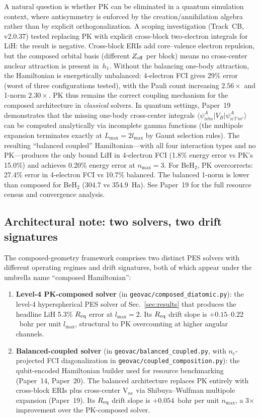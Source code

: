 \documentclass[aps,pra,twocolumn,superscriptaddress,longbibliography,floatfix]{revtex4-2}
\begin{document}
A natural question is whether PK can be eliminated in a quantum
simulation context, where antisymmetry is enforced by the
creation/annihilation algebra rather than by explicit orthogonalization.
A scoping investigation (Track~CB, v2.0.37) tested replacing PK with
explicit cross-block two-electron integrals for LiH:
the result is negative.  Cross-block ERIs add core--valence electron
repulsion, but the composed orbital basis (different $Z_{\rm eff}$ per
block) means no cross-center nuclear attraction is present in~$h_1$.
Without the balancing one-body attraction, the Hamiltonian is
energetically unbalanced: 4-electron FCI gives 29\% error (worst
of three configurations tested), with the Pauli count increasing
$2.56\times$ and 1-norm $2.30\times$.  PK thus remains the correct
coupling mechanism for the composed architecture in \emph{classical}
solvers.  In quantum settings, Paper~19~\cite{loutey_paper19}
demonstrates that the missing one-body cross-center integrals
$\langle \psi_{nlm}^A | V_B | \psi_{n'l'm'}^A \rangle$ can be
computed analytically via incomplete gamma functions (the multipole
expansion terminates exactly at $L_{\max} = 2 l_{\max}$ by Gaunt
selection rules).  The resulting ``balanced coupled''
Hamiltonian---with all four interaction types and no PK---produces
the only bound LiH in 4-electron FCI (1.8\% energy error vs
PK's 15.0\%) and achieves 0.20\% energy error at $n_{\max} = 3$.
For BeH$_2$, PK overcorrects: 27.4\% error in 4-electron FCI vs
10.7\% balanced.  The balanced 1-norm is lower than composed for
BeH$_2$ (304.7 vs 354.9~Ha).  See Paper~19 for the full resource
census and convergence analysis.

\subsection{Architectural note: two solvers, two drift signatures}
\label{sec:two_solvers}

The composed-geometry framework comprises two distinct PES solvers with
different operating regimes and drift signatures, both of which appear
under the umbrella name ``composed Hamiltonian'':

\begin{enumerate}
  \item \textbf{Level-4 PK-composed solver} (in
    \texttt{geovac/composed\_diatomic.py}): the level-4
    hyperspherical PES solver of Sec.~\ref{sec:results} that produces
    the headline LiH 5.3\% $R_{\rm eq}$ error at $l_{\max} = 2$.
    Its $R_{\rm eq}$ drift slope is
    $+0.15$--$0.22$~bohr per unit $l_{\max}$, structural to PK
    overcounting at higher angular channels.
  \item \textbf{Balanced-coupled solver} (in
    \texttt{geovac/balanced\_coupled.py}, with $n_e$-projected FCI
    diagonalization in \texttt{geovac/coupled\_composition.py}):
    the qubit-encoded Hamiltonian builder used for resource
    benchmarking (Paper~14, Paper~20). The balanced architecture
    replaces PK entirely with cross-block ERIs plus cross-center V$_{ne}$
    via Shibuya--Wulfman multipole expansion (Paper~19). Its
    $R_{\rm eq}$ drift slope is $+0.054$~bohr per unit $n_{\max}$,
    a 3$\times$ improvement over the PK-composed solver.
\end{enumerate}
\end{document}
